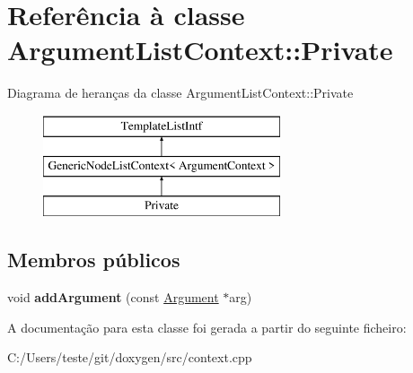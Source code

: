 \hypertarget{class_argument_list_context_1_1_private}{\section{Referência à classe Argument\-List\-Context\-:\-:Private}
\label{class_argument_list_context_1_1_private}
}
Diagrama de heranças da classe Argument\-List\-Context\-:\-:Private\begin{figure}[H]
\begin{center}
\leavevmode
\includegraphics[height=3.000000cm]{class_argument_list_context_1_1_private}
\end{center}
\end{figure}
\subsection*{Membros públicos}
\begin{DoxyCompactItemize}
\item 
\hypertarget{class_argument_list_context_1_1_private_a15dc6ddfa6dcf648f6809b5f54a77b2c}{void {\bfseries add\-Argument} (const \hyperlink{struct_argument}{Argument} $\ast$arg)}\label{class_argument_list_context_1_1_private_a15dc6ddfa6dcf648f6809b5f54a77b2c}

\end{DoxyCompactItemize}


A documentação para esta classe foi gerada a partir do seguinte ficheiro\-:\begin{DoxyCompactItemize}
\item 
C\-:/\-Users/teste/git/doxygen/src/context.\-cpp\end{DoxyCompactItemize}
